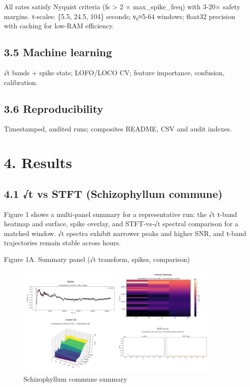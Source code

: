 \documentclass[
  11pt,
]{article}
\begin{document}
All rates satisfy Nyquist criteria (fs \textgreater{} 2 ×
max\_spike\_freq) with 3-20× safety margins. τ-scales: \{5.5, 24.5,
104\} seconds; ν₀≈5-64 windows; float32 precision with caching for
low-RAM efficiency.

\hypertarget{machine-learning}{%
\subsection{3.5 Machine learning}\label{machine-learning}}

√t bands + spike stats; LOFO/LOCO CV; feature importance, confusion,
calibration.

\hypertarget{reproducibility}{%
\subsection{3.6 Reproducibility}\label{reproducibility}}

Timestamped, audited runs; composites README, CSV and audit indexes.

\hypertarget{results}{%
\section{4. Results}\label{results}}

\hypertarget{t-vs-stft-schizophyllum-commune}{%
\subsection{4.1 √t vs STFT (Schizophyllum
commune)}\label{t-vs-stft-schizophyllum-commune}}

Figure 1 shows a multi‑panel summary for a representative run: the √t
τ‑band heatmap and surface, spike overlay, and STFT‑vs‑√t spectral
comparison for a matched window. √t spectra exhibit narrower peaks and
higher SNR, and τ‑band trajectories remain stable across hours.

Figure 1A. Summary panel (√t transform, spikes, comparison)

\begin{figure}
\centering
\includegraphics[width=0.9\textwidth,height=\textheight]{figs/Schizophyllum_commune_summary.png}
\caption{Schizophyllum commune summary}
\end{figure}
\end{document}
